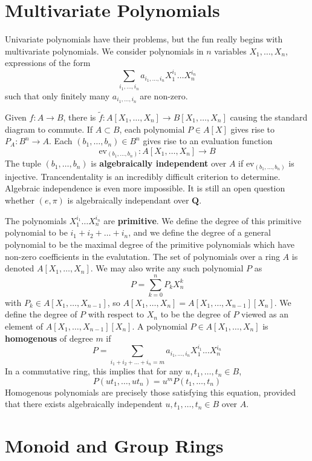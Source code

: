 \section{Multivariate Polynomials}

Univariate polynomials have their problems, but the fun really begins with multivariate polynomials. We consider polynomials in $n$ variables $X_1, \dots, X_n$, expressions of the form
%
\[ \sum_{i_1, \dots, i_n} a_{i_1, \dots, i_n} X_1^{i_1} \dots X_n^{i_n} \]
%
such that only finitely many $a_{i_1, \dots, i_n}$ are non-zero.

Given $f: A \to B$, there is $\tilde{f}: A[X_1, \dots, X_n] \to B[X_1, \dots, X_n]$ causing the standard diagram to commute. If $A \subset B$, each polynomial $P \in A[X]$ gives rise to $P_A: B^n \to A$. Each $(b_1, \dots, b_n) \in B^n$ gives rise to an evaluation function
%
\[ \text{ev}_{(b_1, \dots, b_n)}: A[X_1, \dots, X_n] \to B \]
%
The tuple $(b_1, \dots, b_n)$ is {\bf algebraically independent} over $A$ if $\text{ev}_{(b_1, \dots, b_n)}$ is injective. Trancendentality is an incredibly difficult criterion to determine. Algebraic independence is even more impossible. It is still an open question whether $(e, \pi)$ is algebraically independant over $\mathbf{Q}$.

The polynomials $X_1^{i_1} \dots X_n^{i_n}$ are {\bf primitive}. We define the degree of this primitive polynomial to be $i_1 + i_2 + \dots + i_n$, and we define the degree of a general polynomial to be the maximal degree of the primitive polynomials which have non-zero coefficients in the evalutation. The set of polynomials over a ring $A$ is denoted $A[X_1, \dots, X_n]$. We may also write any such polynomial $P$ as
%
\[ P = \sum_{k=0}^n P_k X_n^k \]
%
with $P_k \in A[X_1, \dots, X_{n-1}]$, so $A[X_1, \dots, X_n] = A[X_1, \dots, X_{n-1}][X_n]$. We define the degree of $P$ with respect to $X_n$ to be the degree of $P$ viewed as an element of $A[X_1, \dots, X_{n-1}][X_n]$. A polynomial $P \in A[X_1, \dots, X_n]$ is {\bf homogenous} of degree $m$ if
%
\[ P = \sum_{i_1 + i_2 + \dots + i_n = m} a_{i_1, \dots, i_n} X_1^{i_1} \dots X_n^{i_n} \]
%
In a commutative ring, this implies that for any $u,t_1, \dots, t_n \in B$,
%
\[ P(ut_1, \dots, ut_n) = u^m P(t_1, \dots, t_n) \]
%
Homogenous polynomials are precisely those satisfying this equation, provided that there exists algebraically independent $u, t_1, \dots, t_n \in B$ over $A$.





\section{Monoid and Group Rings}

